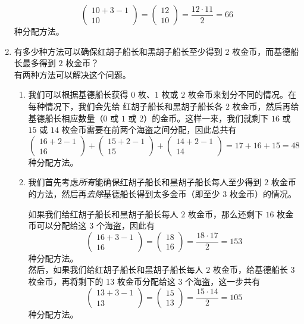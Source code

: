 \begin{example}
\begin{enumerate}[label=(\arabic*)]
              \[\begin{pmatrix}10+3-1\\10\end{pmatrix}=\begin{pmatrix}12\\10\end{pmatrix}=\frac{12 \cdot 11}{2}=66\]
              种分配方法。
        \item 有多少种方法可以确保红胡子船长和黑胡子船长至少得到 $2$ 枚金币，而基德船长最多得到 $2$ 枚金币？\\
              有两种方法可以解决这个问题。
              \begin{enumerate}[label=(\roman*)]
                  \item 我们可以根据基德船长获得 $0$ 枚、$1$ 枚或 $2$ 枚金币来划分不同的情况。在每种情况下，我们会先给 红胡子船长和黑胡子船长各 $2$ 枚金币，然后再给基德船长相应数量（$0$ 或 $1$ 或 $2$）的金币。这样一来，我们就剩下 $16$ 或 $15$ 或 $14$ 枚金币需要在前两个海盗之间分配，因此总共有
                        \[\begin{pmatrix}16+2-1\\16\end{pmatrix}+\begin{pmatrix}15+2-1\\15\end{pmatrix}+\begin{pmatrix}14+2-1\\14\end{pmatrix}=17+16+15=48\]
                        种分配方法。
                  \item 我们首先考虑\emph{所有}能确保红胡子船长和黑胡子船长每人至少得到 $2$ 枚金币的方法，然后再\emph{去除}基德船长得到太多金币（即至少 $3$ 枚金币）的情况。

                        如果我们给红胡子船长和黑胡子船长每人 $2$ 枚金币，那么还剩下 $16$ 枚金币可以分配给这 $3$ 个海盗，因此有
                        \[\begin{pmatrix}16+3-1\\16\end{pmatrix}=\begin{pmatrix}18\\16\end{pmatrix}=\frac{18 \cdot 17}{2}=153\]
                        种分配方法。\\

                        然后，如果我们给红胡子船长和黑胡子船长每人 $2$ 枚金币，给基德船长 $3$ 枚金币，再将剩下的 $13$ 枚金币分配给这 $3$ 个海盗，这一步共有
                        \[\begin{pmatrix}13+3-1\\13\end{pmatrix}=\begin{pmatrix}15\\13\end{pmatrix}=\frac{15 \cdot 14}{2}=105\]
                        种分配方法。\\


\end{enumerate}
\end{enumerate}
\end{example}
